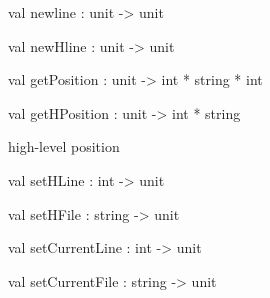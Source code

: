 \documentclass[11pt]{article}
\begin{document}
\label{val:Errormsg.newline}\begin{ocamldoccode}
val newline : unit -> unit
\end{ocamldoccode}




\label{val:Errormsg.newHline}\begin{ocamldoccode}
val newHline : unit -> unit
\end{ocamldoccode}




\label{val:Errormsg.getPosition}\begin{ocamldoccode}
val getPosition : unit -> int * string * int
\end{ocamldoccode}




\label{val:Errormsg.getHPosition}\begin{ocamldoccode}
val getHPosition : unit -> int * string
\end{ocamldoccode}
\begin{ocamldocdescription}
high-level position


\end{ocamldocdescription}




\label{val:Errormsg.setHLine}\begin{ocamldoccode}
val setHLine : int -> unit
\end{ocamldoccode}




\label{val:Errormsg.setHFile}\begin{ocamldoccode}
val setHFile : string -> unit
\end{ocamldoccode}




\label{val:Errormsg.setCurrentLine}\begin{ocamldoccode}
val setCurrentLine : int -> unit
\end{ocamldoccode}




\label{val:Errormsg.setCurrentFile}\begin{ocamldoccode}
val setCurrentFile : string -> unit
\end{ocamldoccode}
\end{document}
